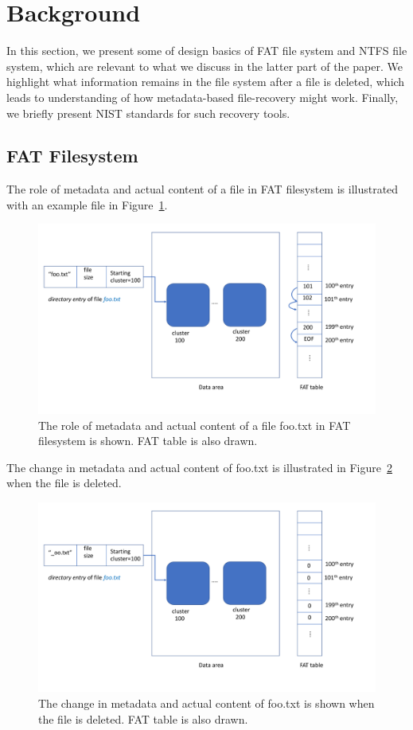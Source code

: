 \section{Background}

In this section, we present some of design basics of FAT file system and NTFS file system, 
which are relevant to what we discuss in the latter part of the paper. 
We highlight what information remains in the file system after a file is deleted, 
which leads to understanding of how metadata-based file-recovery might work. 
Finally, we briefly present NIST standards for such recovery tools.  

\subsection{FAT Filesystem}

The role of metadata and actual content of a file in FAT filesystem is illustrated with an example file in Figure~\ref{fig:fat1}.

\begin{figure}[h]
    \centering
    \includegraphics[width=\linewidth]{fig/fat1.pdf}
    \caption{The role of metadata and actual content of a file foo.txt in FAT filesystem is shown. FAT table is also drawn.}
    \label{fig:fat1}
\end{figure}


The change in metadata and actual content of foo.txt is illustrated in Figure~\ref{fig:fat2} when the file is deleted.

\begin{figure}[h]
    \centering
    \includegraphics[width=\linewidth]{fig/fat2.pdf}
    \caption{The change in metadata and actual content of foo.txt is shown when the file is deleted. FAT table is also drawn.}
    \label{fig:fat2}
\end{figure}

